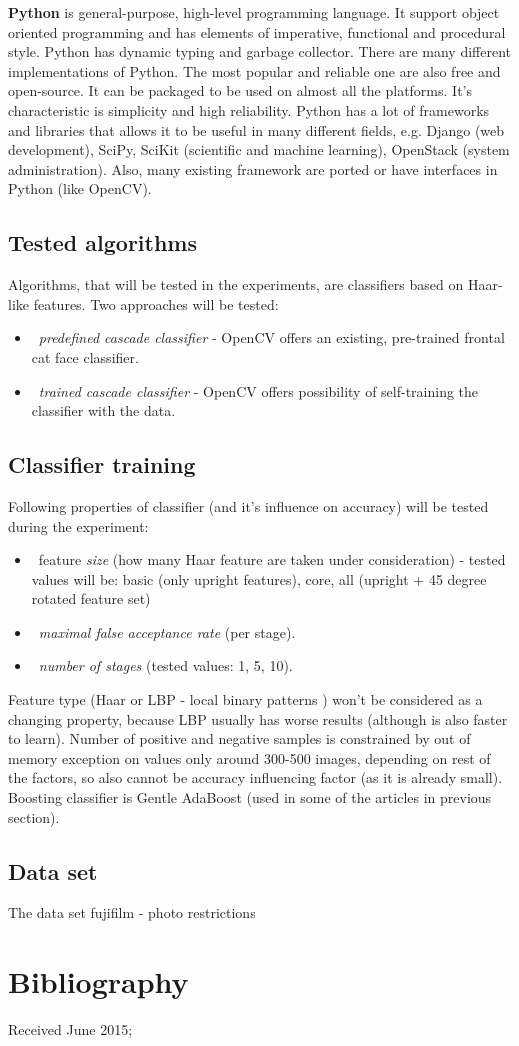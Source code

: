 \documentclass[hyperref]{acmtrans2e}
\begin{document}
\textbf{Python} is general-purpose, high-level programming language. It support object oriented programming and has elements of imperative, functional and procedural style. Python has dynamic typing and garbage collector. There are many different implementations of Python. The most popular and reliable one are also free and open-source. It can be packaged to be used on almost all the platforms. It's characteristic is simplicity and high reliability. Python has a lot of frameworks and libraries that allows it to be useful in many different fields, e.g. Django (web development), SciPy, SciKit (scientific and machine learning), OpenStack (system administration). Also, many existing framework are ported or have interfaces in Python (like OpenCV).
\subsection{Tested algorithms}
Algorithms, that will be tested in the experiments, are classifiers based on Haar-like features. Two approaches will be tested:
\begin{itemize}
\item~\emph{predefined cascade classifier} - OpenCV offers an existing, pre-trained frontal cat face classifier. 
\item~\emph{trained cascade classifier} - OpenCV offers possibility of self-training the classifier with the data. 
\end{itemize}
\subsection{Classifier training}
Following properties of classifier (and it's influence on accuracy) will be tested during the experiment:
\begin{itemize}
\item~feature \emph{size} (how many Haar feature are taken under consideration) - tested values will be: basic (only upright features), core, all (upright + 45 degree rotated feature set)
\item~\emph{maximal false acceptance rate} (per stage).
\item~\emph{number of stages} (tested values: 1, 5, 10).
\end{itemize}
Feature type (Haar or LBP - local binary patterns \cite{lbp:2007}) won't be considered as a changing property, because LBP usually has worse results (although is also faster to learn). Number of positive and negative samples is constrained by out of memory exception on values only around 300-500 images, depending on rest of the factors, so also cannot be accuracy influencing factor (as it is already small). Boosting classifier is Gentle AdaBoost (used in some of the articles in previous section).

\subsection{Data set}
The data set 
fujifilm - photo restrictions

\section{Bibliography}


\begin{received}
Received June 2015;
\end{received}
\end{document}
